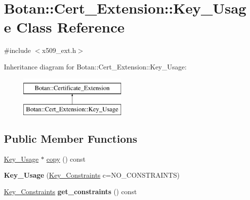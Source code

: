 \hypertarget{classBotan_1_1Cert__Extension_1_1Key__Usage}{\section{Botan\-:\-:Cert\-\_\-\-Extension\-:\-:Key\-\_\-\-Usage Class Reference}
\label{classBotan_1_1Cert__Extension_1_1Key__Usage}
}


{\ttfamily \#include $<$x509\-\_\-ext.\-h$>$}

Inheritance diagram for Botan\-:\-:Cert\-\_\-\-Extension\-:\-:Key\-\_\-\-Usage\-:\begin{figure}[H]
\begin{center}
\leavevmode
\includegraphics[height=2.000000cm]{classBotan_1_1Cert__Extension_1_1Key__Usage}
\end{center}
\end{figure}
\subsection*{Public Member Functions}
\begin{DoxyCompactItemize}
\item 
\hyperlink{classBotan_1_1Cert__Extension_1_1Key__Usage}{Key\-\_\-\-Usage} $\ast$ \hyperlink{classBotan_1_1Cert__Extension_1_1Key__Usage_a0cc4821075b846f5bff1eb79a4a9cbe8}{copy} () const 
\item 
\hypertarget{classBotan_1_1Cert__Extension_1_1Key__Usage_a78c2466e27dcf49dee8340e2c4fa0e63}{{\bfseries Key\-\_\-\-Usage} (\hyperlink{namespaceBotan_aed0885e5c70627dd43827b966e727654}{Key\-\_\-\-Constraints} c=N\-O\-\_\-\-C\-O\-N\-S\-T\-R\-A\-I\-N\-T\-S)}\label{classBotan_1_1Cert__Extension_1_1Key__Usage_a78c2466e27dcf49dee8340e2c4fa0e63}

\item 
\hypertarget{classBotan_1_1Cert__Extension_1_1Key__Usage_a4bc7a9bc4873e7143ec7454dc470c266}{\hyperlink{namespaceBotan_aed0885e5c70627dd43827b966e727654}{Key\-\_\-\-Constraints} {\bfseries get\-\_\-constraints} () const }\label{classBotan_1_1Cert__Extension_1_1Key__Usage_a4bc7a9bc4873e7143ec7454dc470c266}

\end{DoxyCompactItemize}


